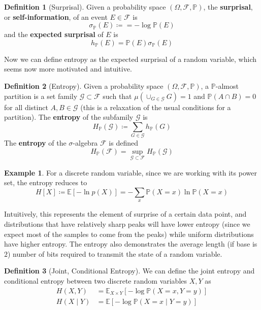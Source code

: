 \documentclass{article}
\theoremstyle{definition}
\newtheorem{example}{Example}[section]
\theoremstyle{remark}
\theoremstyle{definition}
\newtheorem{definition}{Definition}[section]
\begin{document}
\begin{definition}[Surprisal]
Given a probability space $(\Omega, \mathcal{F}, \mathbb{P})$, the \textbf{surprisal}, or \textbf{self-information}, of an event $E \in \mathcal{F}$ is 
\[\sigma_\mathbb{P} (E) \coloneqq = - \log \mathbb{P}(E)\]
and the \textbf{expected surprisal} of $E$ is 
\[h_\mathbb{P} (E) = \mathbb{P}(E) \sigma_\mathbb{P} (E)\]
\end{definition}

Now we can define entropy as the expected surprisal of a random variable, which seems now more motivated and intuitive. 

\begin{definition}[Entropy]
Given a probability space $(\Omega, \mathcal{F}, \mathbb{P})$, a $\mathbb{P}$-almost partition is a set family $\mathcal{G} \subset \mathcal{F}$ such that $\mu(\cup_{G \in \mathcal{G}} G) = 1$ and $\mathbb{P}(A \cap B) = 0$ for all distinct $A, B \in \mathcal{G}$ (this is a relaxation of the usual conditions for a partition). The \textbf{entropy} of the subfamily $\mathcal{G}$ is 
\[H_\mathbb{P} (\mathcal{G}) \coloneqq \sum_{G \in \mathcal{G}} h_\mathbb{P}(G)\]
The \textbf{entropy} of the $\sigma$-algebra $\mathcal{F}$ is defined 
\[H_\mathbb{P} (\mathcal{F}) = \sup_{\mathcal{G} \subset \mathcal{F}} H_\mathbb{P} (\mathcal{G})\]
\end{definition}

\begin{example}
For a discrete random variable, since we are working with its power set, the entropy reduces to 
\[H[X] \coloneqq \mathbb{E}[-\ln{p(X)}] = -\sum_x \mathbb{P}(X = x) \ln{\mathbb{P}(X = x)}\]
\end{example}

Intuitively, this represents the element of surprise of a certain data point, and distributions that have relatively sharp peaks will have lower entropy (since we expect most of the samples to come from the peaks) while uniform distributions have higher entropy. The entropy also demonstrates the average length (if base is $2$) number of bits required to transmit the state of a random variable. 

\begin{definition}[Joint, Conditional Entropy]
We can define the joint entropy and conditional entropy between two discrete random variables $X, Y$ as 
\begin{align*}
    H(X, Y) & = \mathbb{E}_{X \times Y} [-\log \mathbb{P}(X = x, Y = y)] \\
    H(X \mid Y) & = \mathbb{E}[- \log \mathbb{P}(X = x \mid Y = y)]
\end{align*}
\end{definition}
\end{document}
